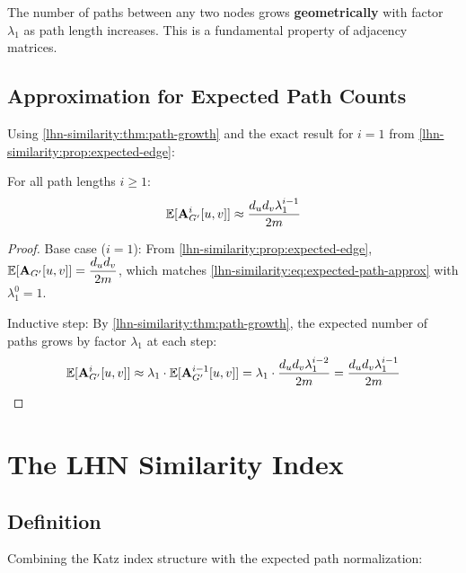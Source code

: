\begin{notechapter}
\begin{intuition}
The number of paths between any two nodes grows \textbf{geometrically} with factor $\lambda_1$ as path length increases. This is a fundamental property of adjacency matrices.
\end{intuition}

\subsection{Approximation for Expected Path Counts}

Using \cref{lhn-similarity:thm:path-growth} and the exact result for $i=1$ from \cref{lhn-similarity:prop:expected-edge}:

\begin{proposition}
\label{lhn-similarity:prop:expected-path-approx}
For all path lengths $i \geq 1$:
\begin{equation}
\mathbb{E}[\mathbf{A}_{G'}^i[u,v]] \approx \frac{d_u d_v \lambda_1^{i-1}}{2m}
\label{lhn-similarity:eq:expected-path-approx}
\end{equation}
\end{proposition}

\begin{proof}
Base case ($i=1$): From \cref{lhn-similarity:prop:expected-edge}, $\mathbb{E}[\mathbf{A}_{G'}[u,v]] = \dfrac{d_u d_v}{2m}$, which matches \cref{lhn-similarity:eq:expected-path-approx} with $\lambda_1^0 = 1$.

Inductive step: By \cref{lhn-similarity:thm:path-growth}, the expected number of paths grows by factor $\lambda_1$ at each step:
\[
\mathbb{E}[\mathbf{A}_{G'}^i[u,v]] \approx \lambda_1 \cdot \mathbb{E}[\mathbf{A}_{G'}^{i-1}[u,v]] = \lambda_1 \cdot \frac{d_u d_v \lambda_1^{i-2}}{2m} = \frac{d_u d_v \lambda_1^{i-1}}{2m}
\]
\end{proof}

\section{The LHN Similarity Index}

\subsection{Definition}

Combining the Katz index structure with the expected path normalization:


\end{notechapter}
